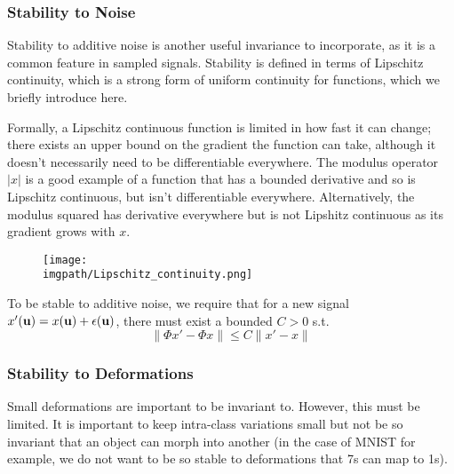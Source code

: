 \subsubsection{Stability to Noise}
  Stability to additive noise is another useful invariance to incorporate,
  as it is a common feature in sampled signals. Stability is defined in terms of
  Lipschitz continuity, which is a strong form of uniform continuity for
  functions, which we briefly introduce here.

  Formally, a Lipschitz continuous function is limited in how fast it can change;
  there exists an upper bound on the gradient the function can take, although it
  doesn't necessarily need to be differentiable everywhere. The modulus operator
  $|x|$ is a good example of a function that has a bounded derivative and so is
  Lipschitz continuous, but isn't differentiable everywhere. Alternatively, the
  modulus squared has derivative everywhere but is not Lipshitz continuous as
  its gradient grows with $x$.

  \begin{figure}
    \begin{center}
      \texttt{[image: \\imgpath/Lipschitz\_continuity.png]}
      \label{fig:lipschitz}
    \end{center}
  \end{figure}

  To be stable to additive noise, we require that for 
  a new signal $x'(\mathbf{u}) = x(\mathbf{u}) + \epsilon(\mathbf{u})$, there must exist
  a bounded $C>0$ s.t.
  \begin{equation}\label{eq:scat_noise_stability}
    \|\Phi x' - \Phi x\| \leq C \|x' - x\|
  \end{equation}

\subsubsection{Stability to Deformations}
  Small deformations are important to be invariant to. However, this must be
  limited. It is important to keep intra-class variations small but not be so 
  invariant that an object can morph into another (in the case of MNIST for
  example, we do not want to be so stable to deformations that 7s can map to
  1s). 
  
